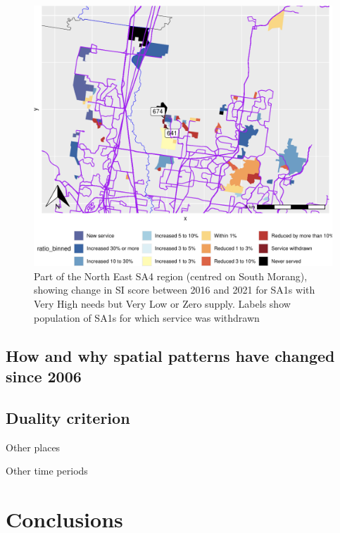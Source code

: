 \documentclass[preprint, 3p,
authoryear]{elsarticle} %
\begin{document}
\begin{figure}
\centering
\includegraphics{ReynoldsCurrieQu2024_files/figure-latex/north_east_changes-1.pdf}
\caption{Part of the North East SA4 region (centred on South Morang),
showing change in SI score between 2016 and 2021 for SA1s with Very High
needs but Very Low or Zero supply. Labels show population of SA1s for
which service was withdrawn}
\end{figure}

\hypertarget{how-and-why-spatial-patterns-have-changed-since-2006}{%
\subsection{How and why spatial patterns have changed since
2006}\label{how-and-why-spatial-patterns-have-changed-since-2006}}

\hypertarget{duality-criterion}{%
\subsection{Duality criterion}\label{duality-criterion}}

Other places

Other time periods

\hypertarget{conclusions}{%
\section{Conclusions}\label{conclusions}}
\end{document}
